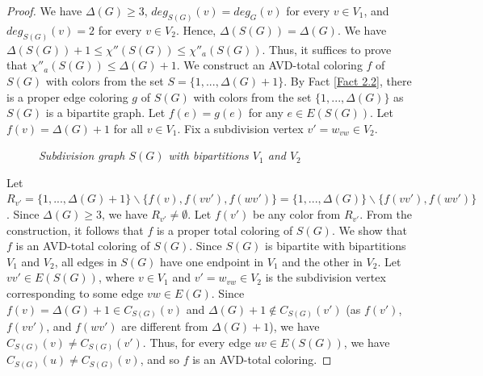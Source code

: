 \documentclass[12pt,reqno,a4paper]{amsart}
\theoremstyle{definition}
\theoremstyle{plain}
\begin{document}
\begin{proof}
We have $\Delta(G)\geq3$, $deg_{S(G)}(v)=deg_G(v)$ for every $v\in V_1$, and $deg_{S(G)}(v)=2$ for every $v\in V_2$. Hence, $\Delta(S(G))=\Delta(G)$.
We have $\Delta(S(G))+1\leq \chi''(S(G))\leq \chi''_{a}(S(G))$. Thus, it suffices to prove that $\chi''_{a}(S(G))\leq\Delta(G)+1$.
We construct an AVD-total coloring $f$ of $S(G)$ with colors from the set $S=\{1,...,\Delta(G)+1\}$. 
By Fact \ref{Fact 2.2}, there is a proper edge coloring $g$ of $S(G)$ with colors from the set $\{1,...,\Delta(G)\}$
as $S(G)$ is a bipartite graph. Let $f(e)=g(e)$ for any $e\in E(S(G))$.
Let $f(v)=\Delta(G)+1$ for all $v\in V_{1}$.
Fix a subdivision vertex $v'=w_{vw}\in V_{2}$.


\begin{figure}[h]
\centering
{}
\vspace{-2mm}
\caption{\em Subdivision graph $S(G)$ with bipartitions $V_1$ and $V_2$}
\end{figure}

Let 
$R_{v'}=\{1,...,\Delta(G)+1\}\backslash\{f(v),  f(vv'), f(wv')\}=\{1,...,\Delta(G)\}\backslash\{  f(vv'), f(wv')\}$. 
Since $\Delta(G)\geq 3$, we have $R_{v'}\neq \emptyset$. Let $f(v')$ be any color from $R_{v'}$.  
From the construction, it follows that $f$ is a proper total coloring of $S(G)$.
We show that $f$ is an AVD-total coloring of $S(G)$.
Since $S(G)$ is bipartite with bipartitions $V_1$ and $V_2$, all edges in $S(G)$ have one endpoint in $V_1$ and the other in $V_2$. 
Let $vv'\in E(S(G))$, where $v\in V_1$ and $v'=w_{vw}\in V_2$ is the subdivision vertex corresponding to some edge $vw\in E(G)$.
Since $f(v)=\Delta(G)+1\in C_{S(G)}(v)$ and $\Delta(G)+1\notin C_{S(G)}(v')$ (as $f(v')$, $f(vv')$, and $f(wv')$ are different from $\Delta(G)+1$), we have $C_{S(G)}(v)\neq C_{S(G)}(v')$.
Thus, for every edge $uv\in E(S(G))$, we have $C_{S(G)}(u)\neq C_{S(G)}(v)$, and so $f$ is an AVD-total coloring.
\end{proof}
\end{document}
